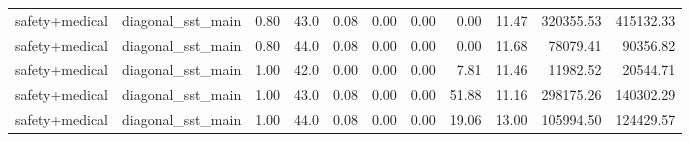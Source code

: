 \begin{table}[H]
{\begin{tabular}{llllrrrrrrr}
safety+medical & diagonal\_sst\_main & 0.80 & 43.0 & 0.08 & 0.00 & 0.00 & 0.00 & 11.47 & 320355.53 & 415132.33 \\
safety+medical & diagonal\_sst\_main & 0.80 & 44.0 & 0.08 & 0.00 & 0.00 & 0.00 & 11.68 & 78079.41 & 90356.82 \\
safety+medical & diagonal\_sst\_main & 1.00 & 42.0 & 0.00 & 0.00 & 0.00 & 7.81 & 11.46 & 11982.52 & 20544.71 \\
safety+medical & diagonal\_sst\_main & 1.00 & 43.0 & 0.08 & 0.00 & 0.00 & 51.88 & 11.16 & 298175.26 & 140302.29 \\
safety+medical & diagonal\_sst\_main & 1.00 & 44.0 & 0.08 & 0.00 & 0.00 & 19.06 & 13.00 & 105994.50 & 124429.57 \\
\bottomrule
\end{tabular}
}
\end{table}